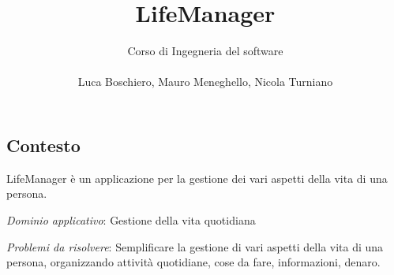 \documentclass[a4paper,12pt]{article}
\title{LifeManager}
\author{
 Corso di Ingegneria del software\\ \\Luca Boschiero, Mauro Meneghello, Nicola Turniano
 }
\begin{document}
 
 \maketitle
 \thispagestyle{fancy}

\subsection*{Contesto}

LifeManager è un applicazione per la gestione dei vari aspetti della vita di una persona.

\textit{Dominio applicativo}: Gestione della vita quotidiana

\textit{Problemi da risolvere}: Semplificare la gestione di vari aspetti della vita di una persona, organizzando attività quotidiane, cose da fare, informazioni, denaro.
\end{document}
